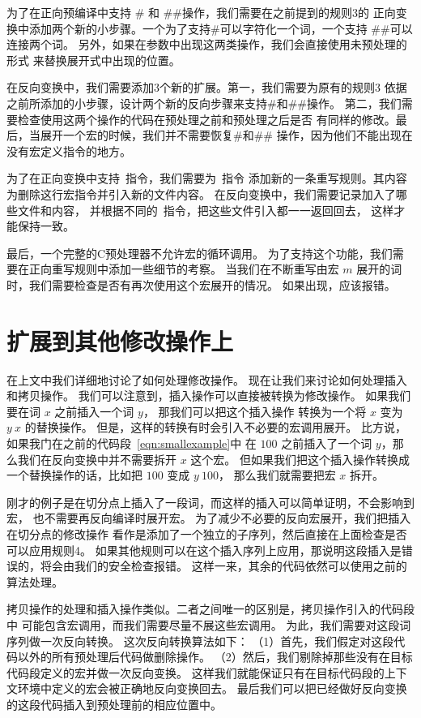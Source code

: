 为了在正向预编译中支持 \# 和 \#\#操作，我们需要在之前提到的规则3的
正向变换中添加两个新的小步骤。一个为了支持\#可以字符化一个词，一个支持
\#\#可以连接两个词。
另外，如果在参数中出现这两类操作，我们会直接使用未预处理的形式
来替换展开式中出现的位置。

在反向变换中，我们需要添加3个新的扩展。第一，我们需要为原有的规则3
依据之前所添加的小步骤，设计两个新的反向步骤来支持\#和\#\#操作。
第二，我们需要检查使用这两个操作的代码在预处理之前和预处理之后是否
有同样的修改。最后，当展开一个宏的时候，我们并不需要恢复\#和\#\#
操作，因为他们不能出现在没有宏定义指令的地方。

为了在正向变换中支持~指令，我们需要为~指令
添加新的一条重写规则。其内容为删除这行宏指令并引入新的文件内容。
在反向变换中，我们需要记录加入了哪些文件和内容，
并根据不同的~指令，把这些文件引入都一一返回回去，
这样才能保持一致。

最后，一个完整的C预处理器不允许宏的循环调用。
为了支持这个功能，我们需要在正向重写规则中添加一些细节的考察。
当我们在不断重写由宏 $m$ 展开的词时，我们需要检查是否有再次使用这个宏展开的情况。
如果出现，应该报错。

\section{扩展到其他修改操作上}\label{sec:extend-other-changes}
在上文中我们详细地讨论了如何处理修改操作。
现在让我们来讨论如何处理插入和拷贝操作。
我们可以注意到，插入操作可以直接被转换为修改操作。
如果我们要在词 $x$ 之前插入一个词 $y$， 那我们可以把这个插入操作
转换为一个将 $x$ 变为  $y\ x$ 的替换操作。
但是，这样的转换有时会引入不必要的宏调用展开。
比方说，如果我门在之前的代码段~\ref{eqn:smallexample}中
在 $100$ 之前插入了一个词 $y$，那么我们在反向变换中并不需要拆开 $x$ 这个宏。
但如果我们把这个插入操作转换成一个替换操作的话，比如把 $100$ 变成 $y\ 100$，
那么我们就需要把宏 $x$ 拆开。

刚才的例子是在切分点上插入了一段词，而这样的插入可以简单证明，不会影响到宏，
也不需要再反向编译时展开宏。
为了减少不必要的反向宏展开，我们把插入在切分点的修改操作
看作是添加了一个独立的子序列，然后直接在上面检查是否可以应用规则4。
如果其他规则可以在这个插入序列上应用，那说明这段插入是错误的，将会由我们的安全检查报错。
这样一来，其余的代码依然可以使用之前的算法处理。

拷贝操作的处理和插入操作类似。二者之间唯一的区别是，拷贝操作引入的代码段中
可能包含宏调用，而我们需要尽量不展这些宏调用。
为此，我们需要对这段词序列做一次反向转换。
这次反向转换算法如下：
（1）首先，我们假定对这段代码以外的所有预处理后代码做删除操作。
（2）然后，我们剔除掉那些没有在目标代码段定义的宏并做一次反向变换。
这样我们就能保证只有在目标代码段的上下文环境中定义的宏会被正确地反向变换回去。
最后我们可以把已经做好反向变换的这段代码插入到预处理前的相应位置中。

